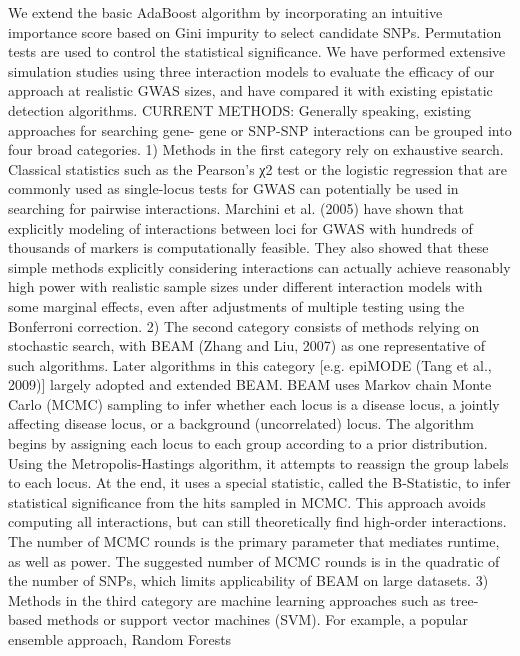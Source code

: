 We extend the basic AdaBoost algorithm by incorporating an intuitive importance score based on Gini impurity to select candidate SNPs.  \cite{li2011detecting}
Permutation tests are used to control the statistical significance. \cite{li2011detecting}
We have performed extensive simulation studies using three interaction models to evaluate the efficacy of our approach at realistic GWAS sizes, and have compared it with existing epistatic detection algorithms. \cite{li2011detecting}
CURRENT METHODS: Generally speaking, existing approaches for searching gene- gene or SNP-SNP interactions can be grouped into four broad categories. \cite{li2011detecting}
	1) Methods in the first category rely on exhaustive search. Classical statistics such as the Pearson's χ2 test or the logistic regression that are commonly used as single-locus tests for GWAS can potentially be used in searching for pairwise interactions. Marchini et al. (2005) have shown that explicitly modeling of interactions between loci for GWAS with hundreds of thousands of markers is computationally feasible. They also showed that these simple methods explicitly considering interactions can actually achieve reasonably high power with realistic sample sizes under different interaction models with some marginal effects, even after adjustments of multiple testing using the Bonferroni correction. \cite{li2011detecting}
	2) The second category consists of methods relying on stochastic search, with BEAM (Zhang and Liu, 2007) as one representative of such algorithms. Later algorithms in this category [e.g. epiMODE (Tang et al., 2009)] largely adopted and extended BEAM. BEAM uses Markov chain Monte Carlo (MCMC) sampling to infer whether each locus is a disease locus, a jointly affecting disease locus, or a background (uncorrelated) locus. The algorithm begins by assigning each locus to each group according to a prior distribution. Using the Metropolis-Hastings algorithm, it attempts to reassign the group labels to each locus. At the end, it uses a special statistic, called the B-Statistic, to infer statistical significance from the hits sampled in MCMC. This approach avoids computing all interactions, but can still theoretically find high-order interactions. The number of MCMC rounds is the primary parameter that mediates runtime, as well as power. The suggested number of MCMC rounds is in the quadratic of the number of SNPs, which limits applicability of BEAM on large datasets. \cite{li2011detecting}
	3) Methods in the third category are machine learning approaches such as tree-based methods or support vector machines (SVM). For example, a popular ensemble approach, Random Forests  \cite{li2011detecting}
